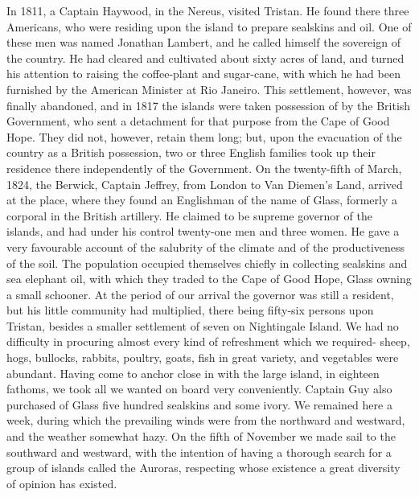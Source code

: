 In 1811, a Captain Haywood, in the Nereus, visited Tristan. He found there
three Americans, who were residing upon the island to prepare sealskins and oil.
One of these men was named Jonathan Lambert, and he called himself the sovereign
of the country. He had cleared and cultivated about sixty acres of land, and
turned his attention to raising the coffee-plant and sugar-cane, with which he
had been furnished by the American Minister at Rio Janeiro. This settlement,
however, was finally abandoned, and in 1817 the islands were taken possession of
by the British Government, who sent a detachment for that purpose from the Cape
of Good Hope. They did not, however, retain them long; but, upon the evacuation
of the country as a British possession, two or three English families took up
their residence there independently of the Government. On the twenty-fifth of
March, 1824, the Berwick, Captain Jeffrey, from London to Van Diemen's Land,
arrived at the place, where they found an Englishman of the name of Glass,
formerly a corporal in the British artillery. He claimed to be supreme governor
of the islands, and had under his control twenty-one men and three women. He
gave a very favourable account of the salubrity of the climate and of the
productiveness of the soil. The population occupied themselves chiefly in
collecting sealskins and sea elephant oil, with which they traded to the Cape of
Good Hope, Glass owning a small schooner. At the period of our arrival the
governor was still a resident, but his little community had multiplied, there
being fifty-six persons upon Tristan, besides a smaller settlement of seven on
Nightingale Island. We had no difficulty in procuring almost every kind of
refreshment which we required- sheep, hogs, bullocks, rabbits, poultry, goats,
fish in great variety, and vegetables were abundant. Having come to anchor close
in with the large island, in eighteen fathoms, we took all we wanted on board
very conveniently. Captain Guy also purchased of Glass five hundred sealskins
and some ivory. We remained here a week, during which the prevailing winds were
from the northward and westward, and the weather somewhat hazy. On the fifth of
November we made sail to the southward and westward, with the intention of
having a thorough search for a group of islands called the Auroras, respecting
whose existence a great diversity of opinion has existed. 

